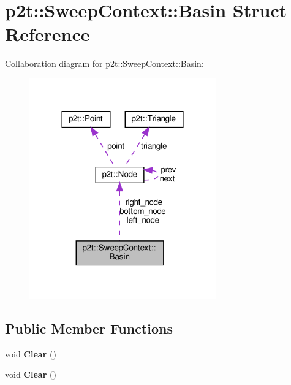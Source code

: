 \hypertarget{structp2t_1_1SweepContext_1_1Basin}{}\section{p2t\+:\+:Sweep\+Context\+:\+:Basin Struct Reference}
\label{structp2t_1_1SweepContext_1_1Basin}


Collaboration diagram for p2t\+:\+:Sweep\+Context\+:\+:Basin\+:
\nopagebreak
\begin{figure}[H]
\begin{center}
\leavevmode
\includegraphics[width=228pt]{structp2t_1_1SweepContext_1_1Basin__coll__graph}
\end{center}
\end{figure}
\subsection*{Public Member Functions}
\begin{DoxyCompactItemize}
\item 
\mbox{\label{structp2t_1_1SweepContext_1_1Basin_a212e9df729cb98f0089a4e54da19fc81}} 
void {\bfseries Clear} ()
\item 
\mbox{\label{structp2t_1_1SweepContext_1_1Basin_a212e9df729cb98f0089a4e54da19fc81}} 
void {\bfseries Clear} ()
\end{DoxyCompactItemize}
